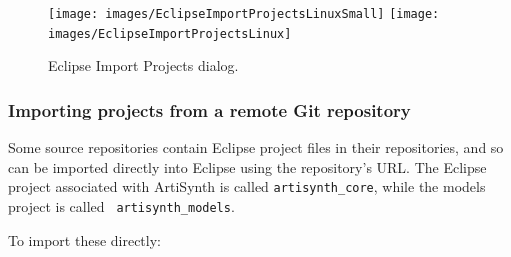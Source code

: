\begin{figure}
\begin{center}
\iflatexml
   \texttt{[image: images/EclipseImportProjectsLinuxSmall]}
\else
   \texttt{[image: images/EclipseImportProjectsLinux]}
\fi   
\end{center}
\caption{Eclipse Import Projects dialog.}%
\label{EclipseImportProjects:fig}
\end{figure}

\subsubsection{Importing projects from a remote Git repository}
\label{importingFromGit}

Some source repositories contain Eclipse project files in their
repositories, and so can be imported directly into Eclipse using the
repository's URL. The Eclipse project associated with ArtiSynth is
called {\tt artisynth\_core}, while the models project is called {\tt
artisynth\_models}.

To import these directly:

